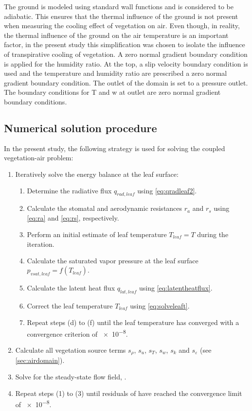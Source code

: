 The ground is modeled using standard wall functions and is considered to be adiabatic. This ensures that the thermal influence of the ground is not present when measuring the cooling effect of vegetation on air. Even though, in reality, the thermal influence of the ground on the air temperature is an important factor, in the present study this simplification was chosen to isolate the influence of transpirative cooling of vegetation. A zero normal gradient boundary condition is applied for the humidity ratio. At the top, a slip velocity boundary condition is used and the temperature and humidity ratio are prescribed a zero normal gradient boundary condition. The outlet of the domain is set to a pressure outlet. The boundary conditions for T and w at outlet are zero normal gradient boundary conditions. 

\subsection{Numerical solution procedure}

In the present study, the following strategy is used for solving the coupled vegetation-air problem:

\begin{enumerate}
\item Iteratively solve the energy balance at the leaf surface:
\begin{enumerate}
	\item Determine the radiative flux $q_{\mathit{rad,leaf}}$ using \cref{eq:qradleaf2}.
	\item Calculate the stomatal and aerodynamic resistances $r_a$ and $r_s$ using \cref{eq:ra} and \cref{eq:rs}, respectively.
	\item Perform an initial estimate of leaf temperature $T_{\mathit{leaf}}=T$ during the iteration.
	\item Calculate the saturated vapor pressure at the leaf surface $p_{\mathit{vsat,leaf}}=f(T_{\mathit{leaf}})$.
	\item Calculate the latent heat flux $q_{\mathit{lat,leaf}}$ using \cref{eq:latentheatflux}. 
	\item Correct the leaf temperature $T_{\mathit{leaf}}$ using \cref{eq:solveleaft}.
	\item Repeat steps (d) to (f) until the leaf temperature has converged with a convergence criterion of \num{e-8}.
\end{enumerate}
\item Calculate all vegetation source terms $s_\rho$, $s_u$, $s_T$, $s_w$, $s_k$ and $s_{\varepsilon}$ (see \cref{sec:airdomain}).
\item Solve for the steady-state flow field, .
\item Repeat steps (1) to (3) until residuals of  have reached the convergence limit of \num{e-8}.
\end{enumerate}

